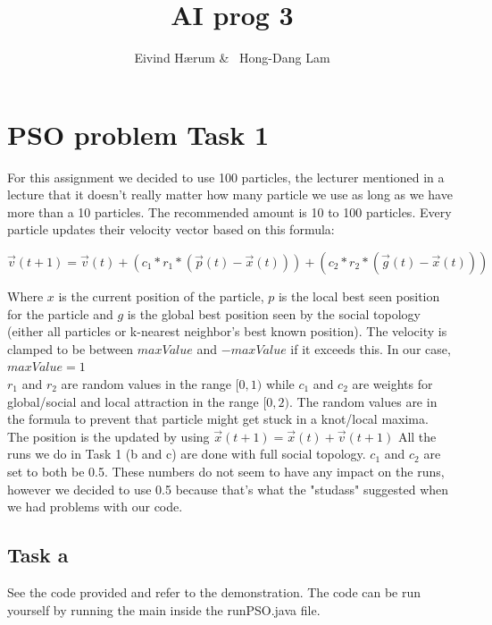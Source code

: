 \documentclass[12pt, a4paper]{article}
\title{AI prog 3}
\author{Eivind Hærum \& \ Hong-Dang Lam}
\begin{document}
\maketitle
% 
% 
 
\newpage
\tableofcontents
\newpage
 
\section{PSO problem Task 1}
For this assignment we decided to use 100 particles, the lecturer mentioned in a lecture that it doesn't really matter how many particle we use as long as we have more than a 10 particles. The recommended amount is 10 to 100 particles.
Every particle updates their velocity vector based on this formula:
\begin{center}
$\vec{v}(t+1)=\vec{v}(t)+(c_1*r_1*(\vec{p}(t)-\vec{x}(t))) +(c_2*r_2*(\vec{g}(t)-\vec{x}(t)))$
\end{center}
Where $x$ is the current position of the particle, $p$ is the local best seen position for the particle and $g$ is the global best position seen by the social topology (either all particles or k-nearest neighbor's best known position). The velocity is clamped to be between $maxValue$ and $-maxValue$ if it exceeds this. In our case, $maxValue = 1$\\
$r_1$ and $r_2$ are random values in the range $[0,1)$ while $c_1$ and $c_2$ are weights for global/social and local attraction in the range $[0,2)$. The random values are in the formula to prevent that particle might get stuck in a knot/local maxima.\\
The position is the updated by using $\vec{x}(t+1)=\vec{x}(t)+\vec{v}(t+1)$
All the runs we do in Task 1 (b and c) are done with full social topology.
$c_1$ and $c_2$ are set to both be 0.5. These numbers do not seem to have any impact on the runs, however we decided to use 0.5 because that's what the "studass" suggested when we had problems with our code.

\subsection{Task a}
See the code provided and refer to the demonstration.
The code can be run yourself by running the main inside the runPSO.java file.
\end{document}
